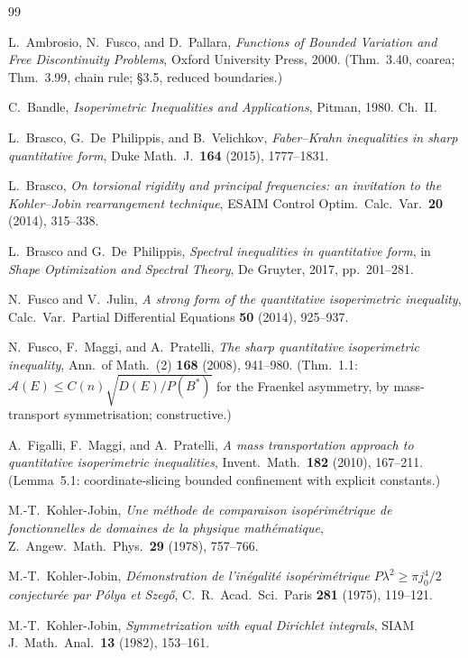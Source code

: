 \documentclass[11pt]{amsart}
\theoremstyle{definition}
\begin{document}
\begin{thebibliography}{99}

L.~Ambrosio, N.~Fusco, and D.~Pallara,
\emph{Functions of Bounded Variation and Free Discontinuity Problems},
Oxford University Press, 2000.
(Thm.~3.40, coarea; Thm.~3.99, chain rule; \S3.5, reduced boundaries.)

C.~Bandle,
\emph{Isoperimetric Inequalities and Applications},
Pitman, 1980. Ch.~II.

L.~Brasco, G.~De~Philippis, and B.~Velichkov,
\emph{Faber--Krahn inequalities in sharp quantitative form},
Duke Math.\ J.\ \textbf{164} (2015), 1777--1831.

L.~Brasco,
\emph{On torsional rigidity and principal frequencies: an invitation to the
Kohler--Jobin rearrangement technique},
ESAIM Control Optim.\ Calc.\ Var.\ \textbf{20} (2014), 315--338.

L.~Brasco and G.~De~Philippis,
\emph{Spectral inequalities in quantitative form}, in
\emph{Shape Optimization and Spectral Theory}, De Gruyter, 2017, pp.~201--281.

N.~Fusco and V.~Julin,
\emph{A strong form of the quantitative isoperimetric inequality},
Calc.\ Var.\ Partial Differential Equations \textbf{50} (2014), 925--937.

N.~Fusco, F.~Maggi, and A.~Pratelli,
\emph{The sharp quantitative isoperimetric inequality},
Ann.\ of Math.\ (2) \textbf{168} (2008), 941--980.
(Thm.~1.1: $\mathcal A(E)\le C(n)\sqrt{D(E)/P(B^*)}$ for the Fraenkel
asymmetry, by mass-transport symmetrisation; constructive.)

A.~Figalli, F.~Maggi, and A.~Pratelli,
\emph{A mass transportation approach to quantitative isoperimetric
inequalities},
Invent.\ Math.\ \textbf{182} (2010), 167--211.
(Lemma~5.1: coordinate-slicing bounded confinement with explicit constants.)

M.-T.~Kohler-Jobin,
\emph{Une m\'ethode de comparaison isop\'erim\'etrique de fonctionnelles de
domaines de la physique math\'ematique},
Z.\ Angew.\ Math.\ Phys.\ \textbf{29} (1978), 757--766.

M.-T.~Kohler-Jobin,
\emph{D\'emonstration de l'in\'egalit\'e isop\'erim\'etrique
\(P\lambda^2\ge\pi j_0^4/2\) conjectur\'ee par P\'olya et Szeg\H{o}},
C.\ R.\ Acad.\ Sci.\ Paris \textbf{281} (1975), 119--121.

M.-T.~Kohler-Jobin,
\emph{Symmetrization with equal Dirichlet integrals},
SIAM J.\ Math.\ Anal.\ \textbf{13} (1982), 153--161.


\end{thebibliography}
\end{document}
